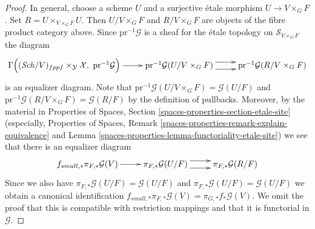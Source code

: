 \documentclass[10pt,a4paper]{amsart}
\theoremstyle{plain}
\theoremstyle{definition}
\theoremstyle{remark}
\numberwithin{equation}{subsection}
\def\Sch{\mathit{Sch}}
\begin{document}
\begin{proof}
\medskip\noindent
In general, choose a scheme $U$ and a surjective \'etale morphism
$U \to V \times_G F$. Set $R = U \times_{V \times_G F} U$. Then
$U/V \times_G F$ and $R/V \times_G F$ are objects of the fibre
product category above. Since $\text{pr}^{-1}\mathcal{G}$ is a
sheaf for the \'etale topology on $\mathcal{S}_{V \times_G F}$
the diagram
$$
\xymatrix{
\Gamma\Big(
(\Sch/V)_{fppf} \times_{\mathcal{Y}} \mathcal{X},
\ \text{pr}^{-1}\mathcal{G}\Big)
\ar[r] &
\text{pr}^{-1}\mathcal{G}(U/V \times_G F) \ar@<1ex>[r] \ar@<-1ex>[r] &
\text{pr}^{-1}\mathcal{G}(R/V \times_G F)
}
$$
is an equalizer diagram. Note that
$\text{pr}^{-1}\mathcal{G}(U/V \times_G F) = \mathcal{G}(U/F)$
and $\text{pr}^{-1}\mathcal{G}(R/V \times_G F) = \mathcal{G}(R/F)$
by the definition of pullbacks. Moreover, by the material in
Properties of Spaces, Section \ref{spaces-properties-section-etale-site}
(especially,
Properties of Spaces,
Remark \ref{spaces-properties-remark-explain-equivalence} and
Lemma \ref{spaces-properties-lemma-functoriality-etale-site})
we see that there is an equalizer diagram
$$
\xymatrix{
f_{small, *}\pi_{F, *}\mathcal{G}(V)
\ar[r] &
\pi_{F, *}\mathcal{G}(U/F) \ar@<1ex>[r] \ar@<-1ex>[r] &
\pi_{F, *}\mathcal{G}(R/F)
}
$$
Since we also have $\pi_{F, *}\mathcal{G}(U/F) = \mathcal{G}(U/F)$
and $\pi_{F, *}\mathcal{G}(U/F) = \mathcal{G}(U/F)$
we obtain a canonical identification
$f_{small, *}\pi_{F, *}\mathcal{G}(V) = \pi_{G, *}f_*\mathcal{G}(V)$.
We omit the proof that this is compatible with restriction mappings
and that it is functorial in $\mathcal{G}$.
\end{proof}
\end{document}
